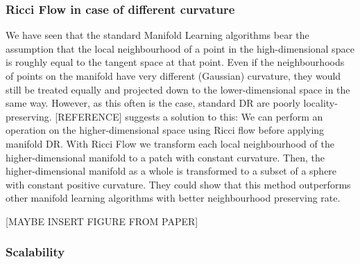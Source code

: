 \documentclass[journal, a4paper]{IEEEtran}
\begin{document}
\subsubsection{Ricci Flow in case of different curvature} 
We have seen that the standard Manifold Learning algorithms bear the assumption that the local neighbourhood of a point in the high-dimensional space is roughly equal to the tangent space at that point. Even if the neighbourhoods of points on the manifold have very different (Gaussian) curvature, they would still be treated equally and projected down to the lower-dimensional space in the same way. However, as this often is the case, standard DR are poorly locality-preserving. [REFERENCE] suggests a solution to this: We can perform an operation on the higher-dimensional space using Ricci flow before applying manifold DR. With Ricci Flow we transform each local neighbourhood of the higher-dimensional manifold to a patch with constant curvature. Then, the higher-dimensional manifold as a whole is transformed to a subset of a sphere with constant positive curvature. They could show that this method outperforms other manifold learning algorithms with better neighbourhood preserving rate.%

[MAYBE INSERT FIGURE FROM PAPER]


\subsubsection{Scalability}
\end{document}
